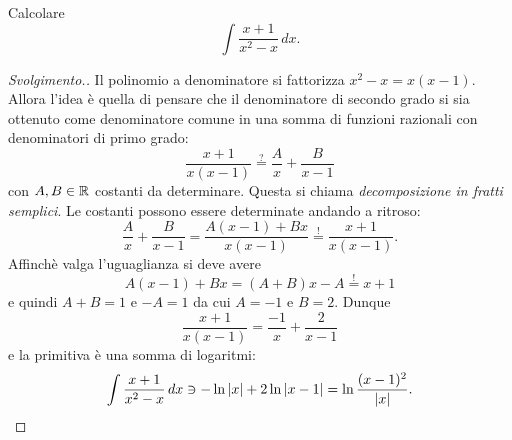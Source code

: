 \begin{example}
Calcolare 
\[
  \int \frac{x+1}{x^2-x}\, dx.
\]
\end{example}
\begin{proof}[Svolgimento.]
Il polinomio a denominatore si fattorizza $x^2 -x = x (x-1)$. 
Allora l'idea è quella di pensare che il denominatore di secondo 
grado si sia ottenuto come denominatore comune in una somma di 
funzioni razionali con denominatori di primo grado:
\begin{equation}\label{eq:541177}
  \frac{x+1}{x(x-1)} \stackrel?= \frac{A}{x} + \frac{B}{x-1}  
\end{equation}
con $A,B\in {\mathbb R}$ costanti da determinare. 
Questa si chiama \emph{decomposizione in fratti semplici}.
%
Le costanti possono essere determinate andando a ritroso:
\[
  \frac{A}{x} + \frac{B}{x-1}    
  = \frac{A(x-1) + Bx}{x(x-1)} \stackrel!= \frac{x+1}{x(x-1)}.
\]
Affinchè valga l'uguaglianza si deve avere 
\[
  A(x-1) + Bx = (A+B)x - A \stackrel!= x+1  
\]
e quindi $A+B = 1$ e $-A=1$ da cui $A=-1$ e $B=2$.
%
%
Dunque 
\[
  \frac{x+1}{x(x-1)} = \frac{-1}{x} + \frac{2}{x-1}  
\]
e la primitiva è una somma di logaritmi:
\[
  \int \frac{x+1}{x^2-x}\, dx
  \ni -\ln{\left|x\right|} + 2 \ln {\left|x-1\right|} 
  = \ln \frac{(x-1)^2}{{\left|x\right|}}.
\]
\end{proof}

